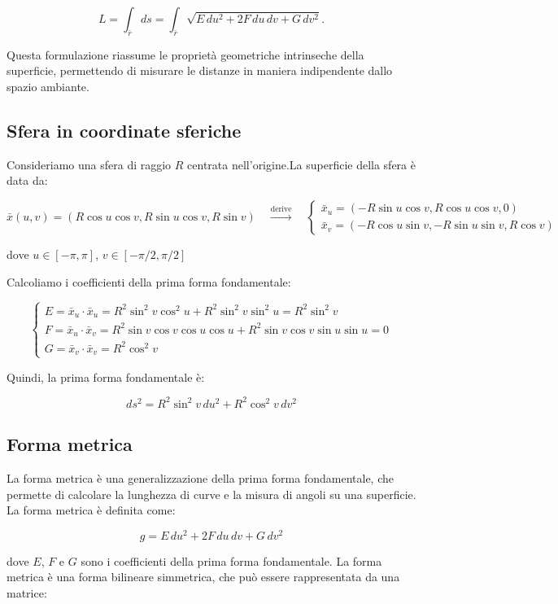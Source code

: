 $$
L = \int_{\bar{r}} ds = \int_{\bar{r}} \sqrt{E\,du^2 + 2F\,du\,dv + G\,dv^2}.
$$

Questa formulazione riassume le proprietà geometriche intrinseche della superficie, permettendo di misurare le distanze in maniera indipendente dallo spazio ambiante.


\subsection{Sfera in coordinate sferiche}

Consideriamo una sfera di raggio $R$ centrata nell'origine.La superficie della sfera è data da:

\small
$$
\bar x(u,v) = (R \cos u \cos v, R \sin u \cos v, R \sin v)
\quad \xrightarrow{\text{derive}} \quad
\begin{cases}
    \bar x_u = (-R \sin u \cos v, R \cos u \cos v, 0)
    \\
    \bar x_v = (-R \cos u \sin v, -R \sin u \sin v, R \cos v)
\end{cases}
$$
\normalsize

dove $u \in [-\pi, \pi]$, $v \in [-\pi/2, \pi/2]$

Calcoliamo i coefficienti della prima forma fondamentale:

$$
\begin{cases}
E = \bar{x}_u \cdot \bar{x}_u = R^2 \sin^2 v \cos^2 u + R^2 \sin^2 v \sin^2 u = R^2 \sin^2 v
\\
F = \bar{x}_u \cdot \bar{x}_v = R^2 \sin v \cos v \cos u \cos u + R^2 \sin v \cos v \sin u \sin u = 0
\\
G = \bar{x}_v \cdot \bar{x}_v = R^2 \cos^2 v
\end{cases}
$$

Quindi, la prima forma fondamentale è:

$$
ds^2 = R^2 \sin^2 v\, du^2 + R^2 \cos^2 v\, dv^2
$$

\subsection{Forma metrica}

La forma metrica è una generalizzazione della prima forma fondamentale, che permette di calcolare la lunghezza di curve e la misura di angoli su una superficie. La forma metrica è definita come:

$$
g = E\,du^2 + 2F\,du\,dv + G\,dv^2
$$

dove $E$, $F$ e $G$ sono i coefficienti della prima forma fondamentale. La forma metrica è una forma bilineare simmetrica, che può essere rappresentata da una matrice:

